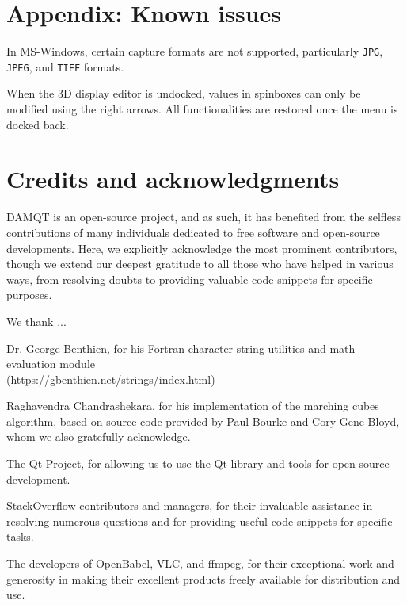 \documentclass[10pt]{article}
\begin{document}
\section{Appendix: Known issues\label{A7}}

In MS-Windows, certain capture formats are not supported, particularly \texttt{JPG}, \texttt{JPEG}, and \texttt{TIFF} formats.

When the 3D display editor is undocked, values in spinboxes can only be modified using the right arrows. All functionalities are 
restored once the menu is docked back.


\section*{Credits and acknowledgments}

DAMQT is an open-source project, and as such, it has benefited from the 
selfless contributions of many individuals dedicated to free software and open-source developments.
Here, we explicitly acknowledge the most prominent contributors, though we extend our deepest
gratitude to all those who have helped in various ways, from resolving doubts
to providing valuable code snippets for specific purposes.

We thank ...

Dr. George Benthien, for his Fortran character string utilities and math evaluation module \\
(https://gbenthien.net/strings/index.html)

Raghavendra Chandrashekara, for his implementation of the marching cubes algorithm,
based on source code provided by Paul Bourke and Cory Gene Bloyd, 
whom we also gratefully acknowledge.

The Qt Project, for allowing us to use the Qt library and tools for open-source development.

StackOverflow contributors and managers, for their invaluable assistance in resolving numerous questions 
and for providing useful code snippets for specific tasks.

The developers of OpenBabel, VLC, and ffmpeg, for their exceptional work and generosity in making
their excellent products freely available for distribution and use.



\newpage

\listoffigures

\printindex
\end{document}
